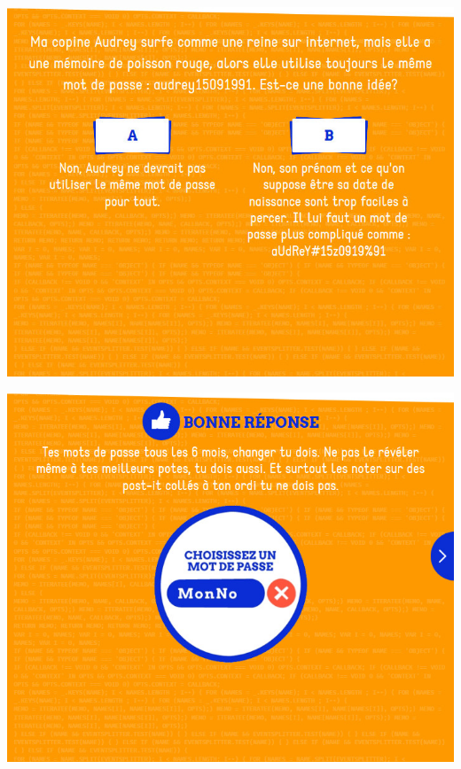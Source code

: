 \documentclass{beamer}
\begin{document}
\begin{frame}\includegraphics[scale=0.6] {./images/Quizz_HygieneNumerique_France4_32.jpg} \end{frame}
\begin{frame}\includegraphics[scale=0.6] {./images/Quizz_HygieneNumerique_France4_33.jpg} \end{frame}
\end{document}
